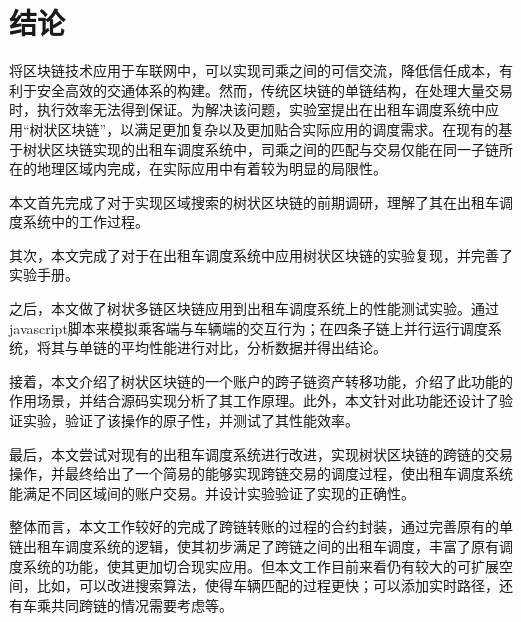

\chapter{结论}

将区块链技术应用于车联网中，可以实现司乘之间的可信交流，降低信任成本，有利于安全高效的交通体系的构建。然而，传统区块链的单链结构，在处理大量交易时，执行效率无法得到保证。为解决该问题，实验室提出在出租车调度系统中应用“树状区块链”，以满足更加复杂以及更加贴合实际应用的调度需求。在现有的基于树状区块链实现的出租车调度系统中，司乘之间的匹配与交易仅能在同一子链所在的地理区域内完成，在实际应用中有着较为明显的局限性。
  
本文首先完成了对于实现区域搜索的树状区块链的前期调研，理解了其在出租车调度系统中的工作过程。

其次，本文完成了对于在出租车调度系统中应用树状区块链的实验复现，并完善了实验手册。

之后，本文做了树状多链区块链应用到出租车调度系统上的性能测试实验。通过javascript脚本来模拟乘客端与车辆端的交互行为；在四条子链上并行运行调度系统，将其与单链的平均性能进行对比，分析数据并得出结论。

接着，本文介绍了树状区块链的一个账户的跨子链资产转移功能，介绍了此功能的作用场景，并结合源码实现分析了其工作原理。此外，本文针对此功能还设计了验证实验，验证了该操作的原子性，并测试了其性能效率。

最后，本文尝试对现有的出租车调度系统进行改进，实现树状区块链的跨链的交易操作，并最终给出了一个简易的能够实现跨链交易的调度过程，使出租车调度系统能满足不同区域间的账户交易。并设计实验验证了实现的正确性。

整体而言，本文工作较好的完成了跨链转账的过程的合约封装，通过完善原有的单链出租车调度系统的逻辑，使其初步满足了跨链之间的出租车调度，丰富了原有调度系统的功能，使其更加切合现实应用。但本文工作目前来看仍有较大的可扩展空间，比如，可以改进搜索算法，使得车辆匹配的过程更快；可以添加实时路径，还有车乘共同跨链的情况需要考虑等。

